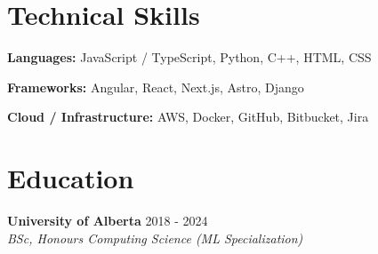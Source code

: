 \documentclass[10pt,letterpaper]{article}
\newcommand{\resumeHeading}[3]{
    \textbf{#1} \hfill #3\\
    \textit{#2}
}
\begin{document}
\section{Technical Skills}

\textbf{Languages:}
JavaScript / TypeScript, Python, C++, HTML, CSS

\textbf{Frameworks:}
Angular, React, Next.js, Astro, Django

\textbf{Cloud / Infrastructure:}
AWS, Docker, GitHub, Bitbucket, Jira



\section{Education}

\resumeHeading
    {University of Alberta}
    {BSc, Honours Computing Science (ML Specialization)}
    {2018 - 2024}
\end{document}
